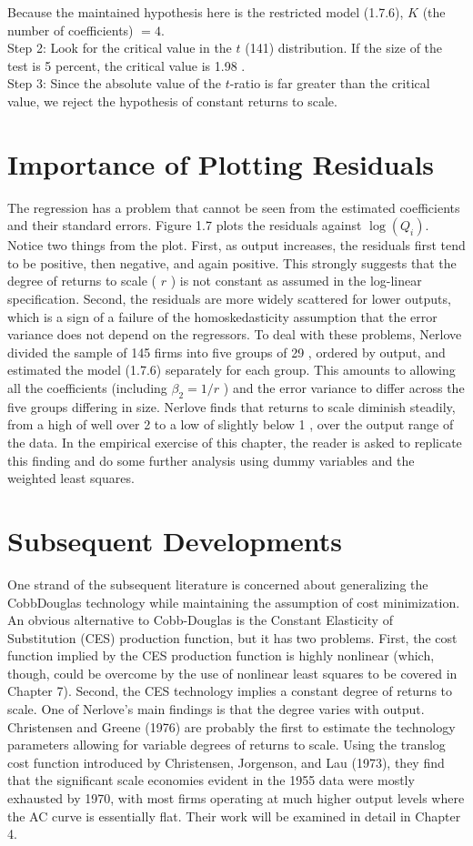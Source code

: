 \documentclass[10pt]{article}
\begin{document}
Because the maintained hypothesis here is the restricted model (1.7.6), $K$ (the number of coefficients) $=4$.\\
Step 2: Look for the critical value in the $t$ (141) distribution. If the size of the test is 5 percent, the critical value is 1.98 .\\
Step 3: Since the absolute value of the $t$-ratio is far greater than the critical value, we reject the hypothesis of constant returns to scale.

\section*{Importance of Plotting Residuals}
The regression has a problem that cannot be seen from the estimated coefficients and their standard errors. Figure 1.7 plots the residuals against $\log \left(Q_{i}\right)$. Notice two things from the plot. First, as output increases, the residuals first tend to be positive, then negative, and again positive. This strongly suggests that the degree of returns to scale ( $r$ ) is not constant as assumed in the log-linear specification. Second, the residuals are more widely scattered for lower outputs, which is a sign of a failure of the homoskedasticity assumption that the error variance does not depend on the regressors. To deal with these problems, Nerlove divided the sample of 145 firms into five groups of 29 , ordered by output, and estimated the model (1.7.6) separately for each group. This amounts to allowing all the coefficients (including $\beta_{2}=1 / r$ ) and the error variance to differ across the five groups differing in size. Nerlove finds that returns to scale diminish steadily, from a high of well over 2 to a low of slightly below 1 , over the output range of the data. In the empirical exercise of this chapter, the reader is asked to replicate this finding and do some further analysis using dummy variables and the weighted least squares.

\section*{Subsequent Developments}
One strand of the subsequent literature is concerned about generalizing the CobbDouglas technology while maintaining the assumption of cost minimization. An obvious alternative to Cobb-Douglas is the Constant Elasticity of Substitution (CES) production function, but it has two problems. First, the cost function implied by the CES production function is highly nonlinear (which, though, could be overcome by the use of nonlinear least squares to be covered in Chapter 7). Second, the CES technology implies a constant degree of returns to scale. One of Nerlove's main findings is that the degree varies with output. Christensen and Greene (1976) are probably the first to estimate the technology parameters allowing for variable degrees of returns to scale. Using the translog cost function introduced by Christensen, Jorgenson, and Lau (1973), they find that the significant scale economies evident in the 1955 data were mostly exhausted by 1970, with most firms operating at much higher output levels where the AC curve is essentially flat. Their work will be examined in detail in Chapter 4.
\end{document}
